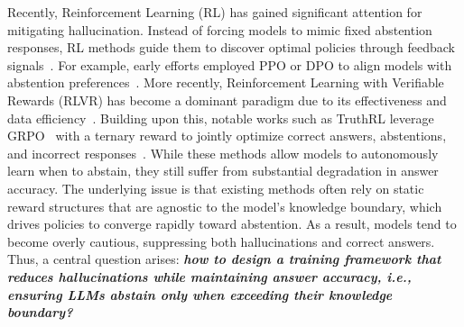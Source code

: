 \documentclass{article} %
\begin{document}
Recently, Reinforcement Learning (RL) has gained significant attention for mitigating hallucination.
Instead of forcing models to mimic fixed abstention responses, RL methods guide them to discover optimal policies through feedback signals~\citep{DeepReinforcementLearningfromHumanPreferences,RLHF,DPO}.
For example, early efforts employed PPO or DPO to align models with abstention preferences~\citep{HH-RLHF,LLMsKnowWhatTheyKnow,Rejection_Improves_Reliability}.
More recently, Reinforcement Learning with Verifiable Rewards (RLVR) has become a dominant paradigm due to its effectiveness and data efficiency~\citep{DeepSeekMath,DeepSeek-V3,Deepseek-r1}. Building upon this, 
notable works such as TruthRL leverage GRPO~\citep{DeepSeekMath} with a ternary reward to jointly optimize correct answers, abstentions, and incorrect responses~\citep{truthrl}. 
While these methods allow models to autonomously learn when to abstain, they still suffer from substantial degradation in answer accuracy.
The underlying issue is that existing methods often rely on static reward structures that are agnostic to the model's knowledge boundary, which drives policies to converge rapidly toward abstention. As a result, models tend to become overly cautious, suppressing both hallucinations and correct answers. Thus, a central question arises: \textit{\textbf{how to design a training framework that reduces hallucinations while maintaining answer accuracy, i.e., ensuring LLMs abstain only when exceeding their knowledge boundary?}}
\end{document}

